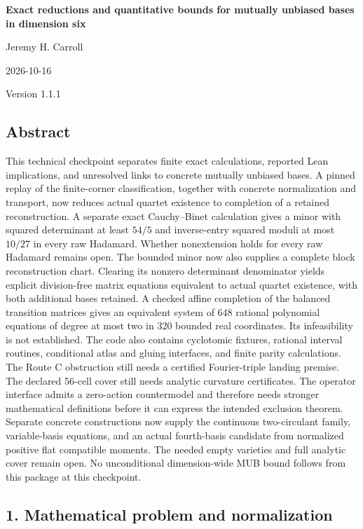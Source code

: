 \documentclass[
]{article}
\author{}
\date{}
\begin{document}
\begin{center}
{\LARGE\bfseries Exact reductions and quantitative bounds for mutually unbiased bases in dimension six\par}
Jeremy H. Carroll\par
2026-10-16\par
Version 1.1.1\par
\end{center}

\subsection{Abstract}\label{abstract}

This technical checkpoint separates finite exact calculations, reported
Lean implications, and unresolved links to concrete mutually unbiased
bases. A pinned replay of the finite-corner classification, together
with concrete normalization and transport, now reduces actual quartet
existence to completion of a retained reconstruction. A separate exact
Cauchy--Binet calculation gives a minor with squared determinant at
least \(54/5\) and inverse-entry squared moduli at most \(10/27\) in
every raw Hadamard. Whether nonextension holds for every raw Hadamard
remains open. The bounded minor now also supplies a complete block
reconstruction chart. Clearing its nonzero determinant denominator
yields explicit division-free matrix equations equivalent to actual
quartet existence, with both additional bases retained. A checked affine
completion of the balanced transition matrices gives an equivalent
system of 648 rational polynomial equations of degree at most two in 320
bounded real coordinates. Its infeasibility is not established. The code
also contains cyclotomic fixtures, rational interval routines,
conditional atlas and gluing interfaces, and finite parity calculations.
The Route C obstruction still needs a certified Fourier-triple landing
premise. The declared 56-cell cover still needs analytic curvature
certificates. The operator interface admits a zero-action countermodel
and therefore needs stronger mathematical definitions before it can
express the intended exclusion theorem. Separate concrete constructions
now supply the continuous two-circulant family, variable-basis
equations, and an actual fourth-basis candidate from normalized positive
flat compatible moments. The needed empty varieties and full analytic
cover remain open. No unconditional dimension-wide MUB bound follows
from this package at this checkpoint.

\subsection{1. Mathematical problem and
normalization}\label{mathematical-problem-and-normalization}
\end{document}
